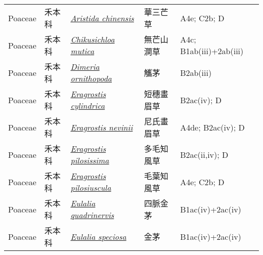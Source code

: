 {\begin{longtable}{L{2.5cm}L{2cm}L{5cm}L{2.5cm}L{3cm}}
    Poaceae & 禾本科 & \href{http://www.theplantlist.org/tpl1.1/search?q=Aristida+chinensis}{\textit{Aristida chinensis} } & 華三芒草 & A4e; C2b; D    \\
    Poaceae & 禾本科 & \href{http://www.theplantlist.org/tpl1.1/search?q=Chikusichloa+mutica}{\textit{Chikusichloa mutica} } & 無芒山澗草 & A4c; B1ab(iii)+2ab(iii)    \\
    Poaceae & 禾本科 & \href{http://www.theplantlist.org/tpl1.1/search?q=Dimeria+ornithopoda}{\textit{Dimeria ornithopoda} } & 觿茅 & B2ab(iii)    \\
    Poaceae & 禾本科 & \href{http://www.theplantlist.org/tpl1.1/search?q=Eragrostis+cylindrica}{\textit{Eragrostis cylindrica} } & 短穗畫眉草 & B2ac(iv); D    \\
    Poaceae & 禾本科 & \href{http://www.theplantlist.org/tpl1.1/search?q=Eragrostis+nevinii}{\textit{Eragrostis nevinii} } & 尼氏畫眉草 & A4de; B2ac(iv); D    \\
    Poaceae & 禾本科 & \href{http://www.theplantlist.org/tpl1.1/search?q=Eragrostis+pilosissima}{\textit{Eragrostis pilosissima} } & 多毛知風草 & B2ac(ii,iv); D    \\
    Poaceae & 禾本科 & \href{http://www.theplantlist.org/tpl1.1/search?q=Eragrostis+pilosiuscula}{\textit{Eragrostis pilosiuscula} } & 毛葉知風草 & A4e; C2b; D    \\
    Poaceae & 禾本科 & \href{http://www.theplantlist.org/tpl1.1/search?q=Eulalia+quadrinervis}{\textit{Eulalia quadrinervis} } & 四脈金茅 & B1ac(iv)+2ac(iv)    \\
    Poaceae & 禾本科 & \href{http://www.theplantlist.org/tpl1.1/search?q=Eulalia+speciosa}{\textit{Eulalia speciosa} } & 金茅 & B1ac(iv)+2ac(iv)    \\

\end{longtable}}
